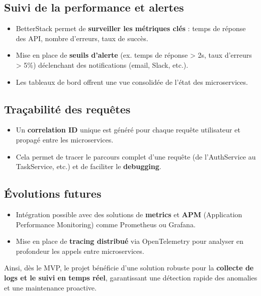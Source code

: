 \subsection{Suivi de la performance et alertes}
\begin{itemize}
	\item BetterStack permet de \textbf{surveiller les métriques clés} : temps de réponse des API, nombre d’erreurs, taux de succès.
	\item Mise en place de \textbf{seuils d’alerte} (ex. temps de réponse > 2s, taux d’erreurs > 5\%) déclenchant des notifications (email, Slack, etc.).
	\item Les tableaux de bord offrent une vue consolidée de l’état des microservices.
\end{itemize}

\subsection{Traçabilité des requêtes}
\begin{itemize}
	\item Un \textbf{correlation ID} unique est généré pour chaque requête utilisateur et propagé entre les microservices.
	\item Cela permet de tracer le parcours complet d’une requête (de l’AuthService au TaskService, etc.) et de faciliter le \textbf{debugging}.
\end{itemize}

\subsection{Évolutions futures}
\begin{itemize}
	\item Intégration possible avec des solutions de \textbf{metrics} et \textbf{APM} (Application Performance Monitoring) comme Prometheus ou Grafana.
	\item Mise en place de \textbf{tracing distribué} via OpenTelemetry pour analyser en profondeur les appels entre microservices.
\end{itemize}

Ainsi, dès le MVP, le projet bénéficie d’une solution robuste pour la \textbf{collecte de logs et le suivi en temps réel}, garantissant une détection rapide des anomalies et une maintenance proactive.


